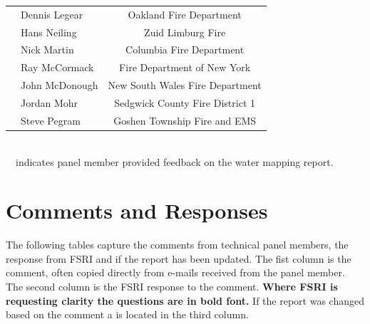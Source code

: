 \documentclass[12pt,oneside]{book}
\begin{document}
\begin{table}[!ht]
\begin{tabular}{llc}
		\checkmark & Dennis Legear    & Oakland Fire Department \\ 
		\checkmark & Hans Neiling     & Zuid Limburg Fire \\ 
		& Nick Martin      & Columbia Fire Department \\ 
		\checkmark & Ray McCormack    & Fire Department of New York \\ 
		& John McDonough   & New South Wales Fire Department \\ 
		\checkmark & Jordan Mohr      & Sedgwick County Fire District 1 \\ 
		& Steve Pegram     & Goshen Township Fire and EMS \\ 
		\bottomrule[1.25pt]
	\end{tabular}
	\\ \checkmark~~indicates panel member provided feedback on the water mapping report.
\end{table}

\newpage



\chapter*{Comments and Responses}
\label{comments}
The following tables capture the comments from technical panel members, the response from FSRI and if the report has been updated. The fist column is the comment, often copied directly from e-mails received from the panel member. The second column is the FSRI response to the comment. \textbf{Where FSRI is requesting clarity the questions are in bold font.} If the report was changed based on the comment a \checkmark is located in the third column. 
\end{document}
